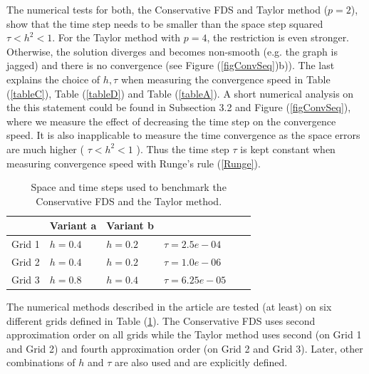 \documentclass[%
 aip,
cp,  
 amsmath,amssymb,
 reprint,
]{iopconfser}
\newcommand{\rf}[1]{(\ref{#1})}
\begin{document}
The numerical tests for both, the Conservative FDS and Taylor method ($p=2$), show that the time step needs to be smaller than the space step squared $\tau < h^2 < 1$. For the Taylor method with $p=4$, the restriction is even stronger. Otherwise, the solution diverges and becomes non-smooth (e.g. the graph is jagged) and there is no convergence (see Figure \rf{figConvSeq}b)). The last explains the choice of $h, \tau$ when measuring the convergence speed in Table \rf{tableC}, Table \rf{tableD} and Table \rf{tableA}. A short numerical analysis on the this statement could be found in Subsection 3.2 and Figure \rf{figConvSeq}, where we measure the effect of decreasing the time step on the convergence speed. It is also inapplicable to measure the time convergence as the space errors are much higher ( $\tau < h^2 < 1$ ). Thus the time step $\tau$ is kept constant when measuring convergence speed with Runge's rule \rf{Runge}.

\begin{table}[ht]
\centering
\small
		\begin{tabular}{|c|l|l|l|l|l|}
			\hline
                               &           Variant a  &           Variant b     &     \\
			\hline
            Grid 1          &            $h=0.4$  &            $h=0.2$     &    $\tau = 2.5e-04$  \\
			\hline
           Grid 2         &            $h=0.4$  &   $h=0.2$  &    $\tau =1.0e-06$   \\   
   			\hline 
           Grid 3         &            $h=0.8$  &            $h=0.4$  &    $\tau =6.25e-05$   \\    
	   \hline
		\end{tabular}
	\caption{ Space and time steps used to benchmark the Conservative FDS and the Taylor method.}
	\label{gridsT}
\end{table}

The numerical methods described in the article are tested (at least) on six different grids defined in Table \rf{gridsT}. The Conservative FDS uses second approximation order on all grids while the Taylor method uses second (on Grid 1 and Grid 2) and fourth approximation order (on Grid 2 and Grid 3). Later, other combinations of $h$ and $\tau$ are also used and are explicitly defined.
\end{document}
